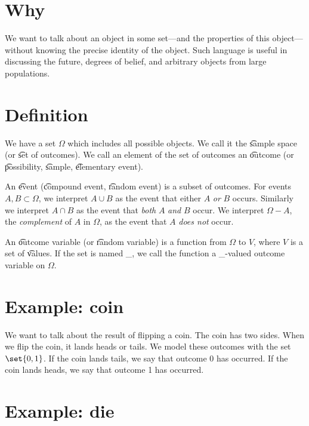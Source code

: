 

\section*{Why}

We want to talk about an object in some set---and the properties of this object---without knowing the precise identity of the object.
Such language is useful in discussing the future, degrees of belief, and arbitrary objects from large populations.

\section*{Definition}

We have a set $\Omega $ which includes all possible objects.
We call it the \t{sample space} (or \t{set of outcomes}).
We call an element of the set of outcomes an \t{outcome} (or \t{possibility}, \t{sample}, \t{elementary event}).

An \t{event} (\t{compound event}, \t{random event}) is a subset of outcomes.
For events $A, B \subset \Omega $, we interpret $A \cup B$ as the event that either $A$ \textit{or} $B$ occurs.
Similarly we interpret $A \cap  B$ as the event that \textit{both} $A$ \textit{and} $B$ occur.
We interpret $\Omega  - A$, the \textit{complement} of $A$ in $\Omega $, as the event that $A$ \textit{does not} occur.

An \t{outcome variable} (or \t{random variable}) is a function from $\Omega $ to $V$, where $V$ is a set of \t{values}.
If the set is named \_, we call the function a \_-valued outcome variable on $\Omega $.

\section*{Example: coin}

We want to talk about the result of flipping a coin.
The coin has two sides.
When we flip the coin, it lands heads or tails.
We model these outcomes with the set $\set{0, 1}$.
If the coin lands tails, we say that outcome 0 has occurred.
If the coin lands heads, we say that outcome 1 has occurred.

\section*{Example: die}

